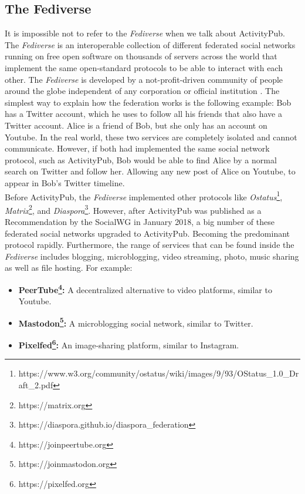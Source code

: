\subsection{The Fediverse}

It is impossible not to refer to the \emph{Fediverse} when we talk about ActivityPub. The \emph{Fediverse} is an interoperable collection of different federated social networks running on free open software on thousands of servers across the world that implement the same open-standard protocols to be able to interact with each other. The \emph{Fediverse} is developed by a not-profit-driven community of people around the globe independent of any corporation or official institution \cite{holloway_2018} \cite{https://doi.org/10.48550/arxiv.1909.05801}. The simplest way to explain how the federation works is the following example: Bob has a Twitter account, which he uses to follow all his friends that also have a Twitter account. Alice is a friend of Bob, but she only has an account on Youtube. In the real world, these two services are completely isolated and cannot communicate. However, if both had implemented the same social network protocol, such as ActivityPub, Bob would be able to find Alice by a normal search on Twitter and follow her. Allowing any new post of Alice on Youtube, to appear in Bob's Twitter timeline. \\
Before ActivityPub, the \emph{Fediverse} implemented other protocols like \emph{Ostatus}\footnote{https://www.w3.org/community/ostatus/wiki/images/9/93/OStatus\_1.0\_Draft\_2.pdf}, \emph{Matrix}\footnote{https://matrix.org}, and \emph{Diaspora}\footnote{https://diaspora.github.io/diaspora\_federation}. However, after ActivityPub was published as a Recommendation by the SocialWG in January 2018, a big number of these federated social networks upgraded to ActivityPub. Becoming the predominant protocol rapidly. Furthermore, the range of services that can be found inside the \emph{Fediverse} includes blogging, microblogging, video streaming, photo, music sharing as well as file hosting. For example: 

\begin{itemize}
  \item \textbf{PeerTube\footnote{https://joinpeertube.org}:} A decentralized alternative to video platforms, similar to Youtube.
  \item \textbf{Mastodon\footnote{https://joinmastodon.org}:} A microblogging social network, similar to Twitter. 
  \item \textbf{Pixelfed\footnote{https://pixelfed.org}:} An image-sharing platform, similar to Instagram. 
\end{itemize} 

